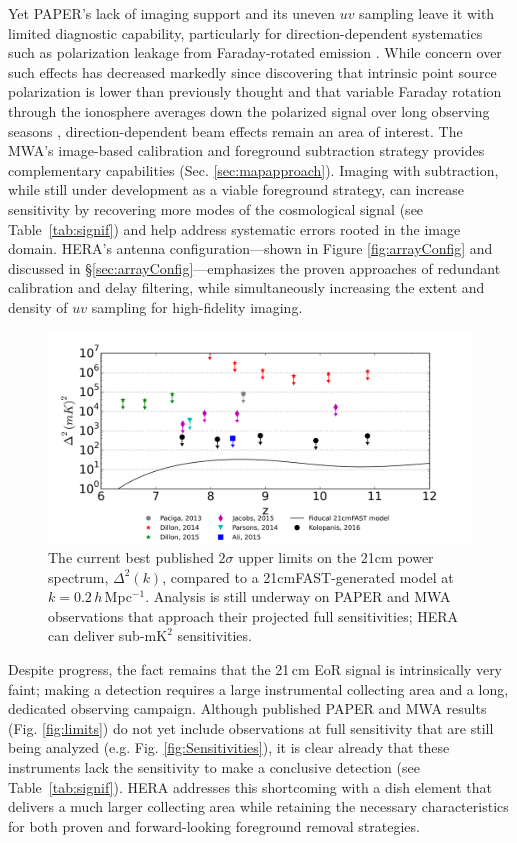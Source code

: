 \documentclass[preprint,11pt]{aastex}
\newcommand{\Mycitep}[1]{\citep{#1}}
\begin{document}
Yet PAPER's lack of imaging support and its uneven $uv$ sampling 
leave it with limited diagnostic capability, particularly for direction-dependent systematics
such as polarization leakage from Faraday-rotated emission \Mycitep{moore_et_al2013}.
While concern over such effects has decreased markedly since discovering that
intrinsic point source polarization is lower than previously thought
\citep{asad_et_al2015} and that variable Faraday rotation through the
ionosphere averages down the polarized signal over long observing seasons
\Mycitep{moore_et_al2016}, direction-dependent beam effects remain an area of interest.
The MWA's image-based calibration and foreground subtraction strategy provides complementary
capabilities (Sec. \ref{sec:mapapproach}). Imaging with subtraction, while still under development as a viable foreground strategy,
can increase sensitivity by recovering more modes of the cosmological signal (see
Table~\ref{tab:signif}) and help address systematic errors rooted
in the image domain.  HERA's antenna configuration---shown in Figure \ref{fig:arrayConfig} and discussed in \S\ref{sec:arrayConfig}---emphasizes
the proven approaches of redundant calibration and delay filtering, while simultaneously
increasing the extent and density of $uv$ sampling for high-fidelity imaging.  

\begin{figure}[t]
	\centering
	\includegraphics[width=.8\textwidth]{plots/summary_results.png}
	\caption{The current best published $2\sigma$ upper limits on the 21cm power spectrum, $\Delta^2(k)$, compared to a 21cmFAST-generated model at $k=0.2$\,$h$\,Mpc$^{-1}$.   Analysis is still underway on PAPER and MWA observations that approach their projected full sensitivities;  HERA can deliver sub-$\text{mK}^2$ sensitivities.}
	\vspace{-10pt}
	\label{fig:limits}
	\label{fig:IGMtemperatureConstraints}
\end{figure}

Despite progress, the fact remains that the 21\,cm EoR signal is intrinsically very faint; making a detection requires a
large instrumental collecting area and a long, dedicated observing campaign.
Although published PAPER and MWA results (Fig. \ref{fig:limits}) do not yet include observations 
at full sensitivity that are still being analyzed (e.g. Fig. \ref{fig:Sensitivities}), 
it is clear already that these instruments lack the sensitivity
to make a conclusive detection (see Table~\ref{tab:signif}). 
HERA addresses this shortcoming with a dish element that delivers a much larger collecting area 
while retaining the necessary characteristics for both proven and forward-looking foreground removal strategies.
\end{document}
